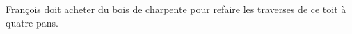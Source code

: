 \documentclass[10pt]{article}
\begin{document}
François doit acheter du bois de charpente pour refaire les traverses de ce toit à quatre pans.
%
\end{document}
